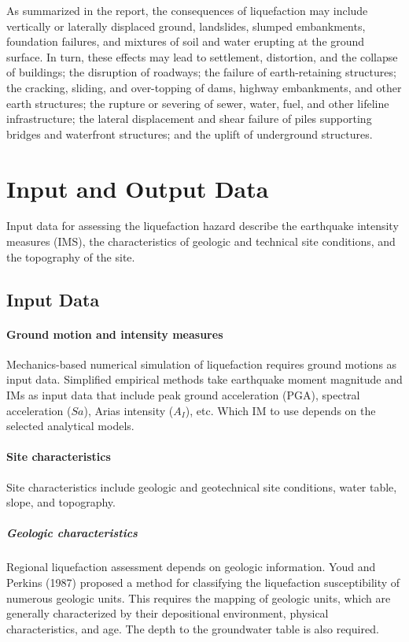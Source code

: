 As summarized in the \citet{national2016state} report, the consequences of liquefaction may include vertically or laterally displaced ground, landslides, slumped embankments, foundation failures, and mixtures of soil and water erupting at the ground surface. In turn, these effects may lead to settlement, distortion, and the collapse of buildings; the disruption of roadways; the failure of earth-retaining structures; the cracking, sliding, and over-topping of dams, highway embankments, and other earth structures; the rupture or severing of sewer, water, fuel, and other lifeline infrastructure; the lateral displacement and shear failure of piles supporting bridges and waterfront structures; and the uplift of underground structures.

\section{Input and Output Data}

Input data for assessing the liquefaction hazard describe the earthquake intensity measures (IMS), the characteristics of geologic and technical site conditions, and the topography of the site.

\subsection{Input Data}
\label{subsec:eq_liquefaction_input}

\paragraph{Ground motion and intensity measures}
Mechanics-based numerical simulation of liquefaction requires ground motions as input data. Simplified empirical methods take earthquake moment magnitude and IMs as input data that include peak ground acceleration (PGA), spectral acceleration (${Sa}$), Arias intensity (${A_I}$), etc. Which IM to use depends on the selected analytical models.


\paragraph{Site characteristics}
Site characteristics include geologic and geotechnical site conditions, water table, slope, and topography.

\subparagraph{Geologic characteristics}
Regional liquefaction assessment depends on geologic information.
Youd and Perkins (1987) proposed a method for classifying the liquefaction susceptibility of numerous geologic units. This requires the mapping of geologic units, which are generally characterized by their depositional environment, physical characteristics, and age. The depth to the groundwater table is also required.

